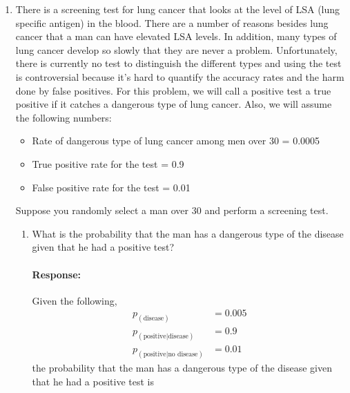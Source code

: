 \documentclass [11pt] {article}
\newenvironment{response}{\begin{responseframe}\vspace{-10pt}\paragraph{Response:}}{\end{responseframe}}
\begin{document}
\begin{enumerate}
\begin{enumerate}
            \item There is a screening test for lung cancer that looks at the level of LSA (lung
                specific antigen) in the blood. There are a number of reasons besides lung cancer 
                that a man can have elevated LSA levels. In addition, many types of lung cancer 
                develop so slowly that they are never a problem. Unfortunately, there is currently 
                no test to distinguish the different types and using the test is controversial 
                because it’s hard to quantify the accuracy rates and the harm done by false 
                positives. For this problem, we will call a positive test a true positive if it 
                catches a dangerous type of lung cancer. Also, we will assume the following numbers:
                \begin{itemize}
                    \item Rate of dangerous type of lung cancer among men over 30 = 0.0005
                    \item True positive rate for the test = 0.9
                    \item False positive rate for the test = 0.01
                \end{itemize}
                Suppose you randomly select a man over 30 and perform a screening test.
                \begin{enumerate}[itemsep=10pt]
                    \item What is the probability that the man has a dangerous type of the disease
                        given that he had a positive test?
                        \begin{response}
                            Given the following,
                            \begin{align*}
                                p_{(\text{disease})} &= 0.005 \\
                                p_{(\text{positive} | \text{disease})} &= 0.9 \\
                                p_{(\text{positive} | \text{no disease})} &= 0.01
                            \end{align*}
                            the probability that the man has a dangerous type of the disease given 
                            that he had a positive test is


\end{response}
\end{enumerate}
\end{enumerate}
\end{enumerate}
\end{document}
